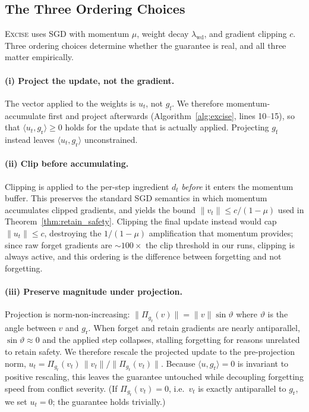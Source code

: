 \documentclass{article}
\newcommand{\ours}{\textsc{Excise}}
\newcommand{\gf}{g_{\mathrm{f}}}
\newcommand{\gr}{g_{\mathrm{r}}}
\theoremstyle{remark}
\theoremstyle{plain}
\begin{document}
\subsection{The Three Ordering Choices}

\ours{} uses SGD with momentum $\mu$, weight decay $\lambda_{\mathrm{wd}}$, and
gradient clipping $c$. Three ordering choices determine whether the guarantee is
real, and all three matter empirically.

\paragraph{(i) Project the update, not the gradient.}
The vector applied to the weights is $u_t$, not $\gf$. We therefore
momentum-accumulate first and project afterwards
(Algorithm~\ref{alg:excise}, lines 10--15), so that
$\langle u_t,\gr\rangle \ge 0$ holds for the update that is actually applied.
Projecting $\gf$ instead leaves $\langle u_t,\gr\rangle$ unconstrained.

\paragraph{(ii) Clip before accumulating.}
Clipping is applied to the per-step ingredient $d_t$ \emph{before} it enters the
momentum buffer. This preserves the standard SGD semantics in which momentum
accumulates clipped gradients, and yields the bound
$\|v_t\| \le c/(1-\mu)$ used in Theorem~\ref{thm:retain_safety}. Clipping the
final update instead would cap $\|u_t\| \le c$, destroying the
$1/(1-\mu)$ amplification that momentum provides; since raw forget gradients are
${\sim}100\times$ the clip threshold in our runs, clipping is always active, and
this ordering is the difference between forgetting and not forgetting.

\paragraph{(iii) Preserve magnitude under projection.}
Projection is norm-non-increasing: $\|\Pi_{\gr}(v)\| = \|v\|\sin\vartheta$ where
$\vartheta$ is the angle between $v$ and $\gr$. When forget and retain gradients
are nearly antiparallel, $\sin\vartheta \approx 0$ and the applied step
collapses, stalling forgetting for reasons unrelated to retain safety. We
therefore rescale the projected update to the pre-projection norm,
$u_t = \Pi_{\gr}(v_t)\,\|v_t\|/\|\Pi_{\gr}(v_t)\|$. Because
$\langle u,\gr\rangle = 0$ is invariant to positive rescaling, this leaves the
guarantee untouched while decoupling forgetting speed from conflict severity.
(If $\Pi_{\gr}(v_t)=0$, i.e.\ $v_t$ is exactly antiparallel to $\gr$, we set
$u_t=0$; the guarantee holds trivially.)
\end{document}
